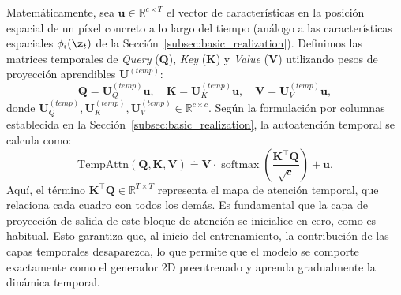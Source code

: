 \documentclass[../../book-main_es.tex]{subfiles}
\begin{document}
Matemáticamente, sea $\boldsymbol{u} \in \mathbb{R}^{c \times T}$ el vector de características en 
la posición espacial de un píxel concreto a lo largo del tiempo (análogo a las características 
espaciales $\phi_i(\z_t)$ de la Sección~\ref{subsec:basic_realization}). Definimos las matrices 
temporales de \textit{Query} ($\boldsymbol{Q}$), \textit{Key} ($\boldsymbol{K}$) y \textit{Value} ($\boldsymbol{V}$) 
utilizando pesos de proyección aprendibles $\boldsymbol{U}^{(temp)}$:
\begin{equation}
    \boldsymbol{Q} = \boldsymbol{U}^{(temp)}_Q \boldsymbol{u}, \quad \boldsymbol{K} = \boldsymbol{U}^{(temp)}_K \boldsymbol{u}, \quad \boldsymbol{V} = \boldsymbol{U}^{(temp)}_V \boldsymbol{u},
\end{equation}
donde $\boldsymbol{U}^{(temp)}_{Q}, \boldsymbol{U}^{(temp)}_{K}, \boldsymbol{U}^{(temp)}_{V} \in \mathbb{R}^{c \times c}$. 
Según la formulación por columnas establecida en la Sección~\ref{subsec:basic_realization}, la autoatención temporal se calcula como:
\begin{equation}
    \text{TempAttn}(\boldsymbol{Q}, \boldsymbol{K}, \boldsymbol{V}) \doteq \boldsymbol{V} \cdot \operatorname{softmax}\left( \frac{\boldsymbol{K}^\top \boldsymbol{Q}}{\sqrt{c}} \right) + \boldsymbol{u}.
\end{equation}
Aquí, el término $\boldsymbol{K}^\top \boldsymbol{Q} \in \mathbb{R}^{T \times T}$ representa 
el mapa de atención temporal, que relaciona cada cuadro con todos los demás. Es fundamental 
que la capa de proyección de salida de este bloque de atención se inicialice en 
cero, como es habitual. Esto garantiza que, al inicio del entrenamiento, la contribución de las capas temporales 
desaparezca, lo que permite que el modelo se comporte exactamente como el generador 2D 
preentrenado y aprenda gradualmente la dinámica temporal.
\end{document}
